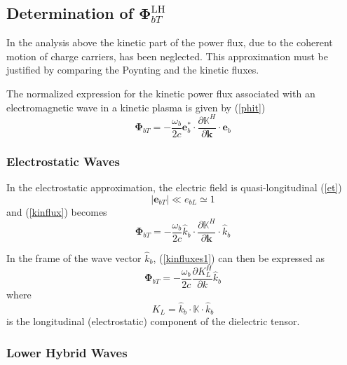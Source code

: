 \subsection{Determination of $\mathbf{\Phi}_{bT}^{\text{LH}}$ \label{kinetic}}

\bigskip In the analysis above the kinetic part of the power flux, due to the
coherent motion of charge carriers, has been neglected. This approximation
must be justified by comparing the Poynting and the kinetic fluxes.

The normalized expression for the kinetic power flux associated with an
electromagnetic wave in a kinetic plasma is given by (\ref{phit})
\begin{equation}
\mathbf{\Phi}_{bT}=\mathbf{-}\frac{\omega_{b}}{2c}\mathbf{e}_{b}^{\ast}%
\cdot\frac{\partial\mathbb{K}^{H}}{\partial\mathbf{k}}\cdot\mathbf{e}_{b}
\label{kinflux}%
\end{equation}

\subsubsection{Electrostatic Waves}

In the electrostatic approximation, the electric field is quasi-longitudinal
(\ref{et})
\begin{equation}
\left|  \mathbf{e}_{bT}\right|  \ll e_{bL}\simeq1
\end{equation}
and (\ref{kinflux}) becomes
\begin{equation}
\mathbf{\Phi}_{bT}=\mathbf{-}\frac{\omega_{b}}{2c}\widehat{k}_{b}\cdot
\frac{\partial\mathbb{K}^{H}}{\partial\mathbf{k}}\cdot\widehat{k}_{b}
\label{kinfluxes1}%
\end{equation}

In the frame of the wave vector $\widehat{k}_{b}$, (\ref{kinfluxes1}) can then
be expressed as
\begin{equation}
\mathbf{\Phi}_{bT}=\mathbf{-}\frac{\omega_{b}}{2c}\frac{\partial K_{L}^{H}%
}{\partial k}\widehat{k}_{b} \label{kinfluxes2}%
\end{equation}
where
\begin{equation}
K_{L}=\widehat{k}_{b}\cdot\mathbb{K}\cdot\widehat{k}_{b}%
\end{equation}
is the longitudinal (electrostatic) component of the dielectric tensor.

\subsubsection{Lower Hybrid Waves}

